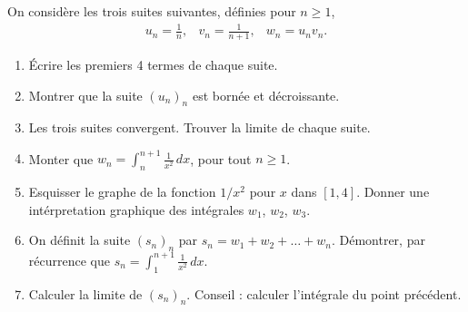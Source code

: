 \begin{exercice}
  
On considère les trois suites suivantes, définies pour $n\geq 1$, 
\begin{equation}\nonumber
  \begin{array}{ccc}
   \displaystyle  u_n=\frac{1}{n}, &\displaystyle  v_n=\frac{1}{n+1}, & \displaystyle w_n=u_nv_n.
  \end{array}
\end{equation}
\begin{enumerate}
\item Écrire les premiers 4 termes de chaque suite.
\item Montrer que la suite $(u_n)_n$ est bornée et décroissante.  
\item Les trois suites convergent. Trouver la limite de chaque suite.
\item Monter que $\displaystyle w_n=\int_{n}^{n+1}\frac{1}{x^2}\, dx$, pour tout $n\geq 1$.
\item Esquisser le graphe de la fonction $1/x^2$ pour $x$ dans $[1,4]$. Donner une intérpretation graphique des intégrales  $w_1$, $w_2$, $w_3$. 
\item On définit la suite $(s_n)_n$ par $s_n= w_1+w_2+\ldots+ w_n$. Démontrer, par récurrence que $s_n=\int_{1}^{n+1}\frac{1}{x^2}\,dx$.
\item Calculer la limite de $(s_n)_n$. Conseil : calculer l'intégrale du point précédent.  
\end{enumerate}
\end{exercice}
